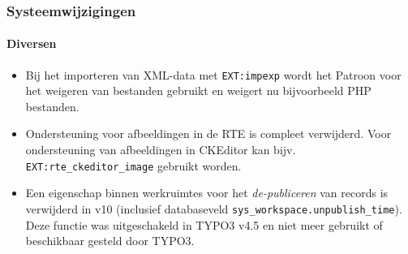 
\begin{frame}[fragile]
	\frametitle{Systeemwijzigingen}
	\framesubtitle{Diversen}

	\lstset{basicstyle=\tiny\ttfamily}

	\begin{itemize}

		\item Bij het importeren van XML-data met \texttt{EXT:impexp} wordt het Patroon voor het weigeren van bestanden gebruikt en
			weigert nu bijvoorbeeld PHP bestanden.

		\item Ondersteuning voor afbeeldingen in de RTE is compleet verwijderd.
			Voor ondersteuning van afbeeldingen in CKEditor kan bijv. \texttt{EXT:rte\_ckeditor\_image} gebruikt worden.

		\item Een eigenschap binnen werkruimtes voor het \textit{de-publiceren} van records is verwijderd in v10
			(inclusief databaseveld \texttt{sys\_workspace.unpublish\_time}). Deze functie was uitgeschakeld
			in TYPO3 v4.5 en niet meer gebruikt of beschikbaar gesteld door TYPO3.

	\end{itemize}

\end{frame}


